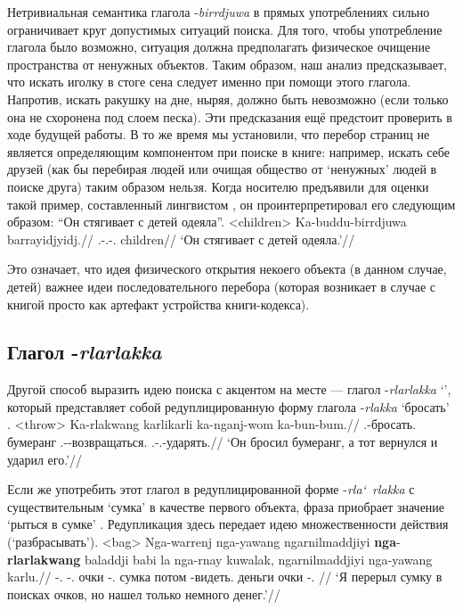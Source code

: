 Нетривиальная семантика глагола -\textit{birrdjuwa} в прямых употреблениях сильно ограничивает круг допустимых ситуаций поиска. Для того, чтобы употребление глагола было возможно, ситуация должна предполагать физическое очищение пространства от ненужных объектов. %
Таким образом, наш анализ предсказывает, что искать иголку в стоге сена следует именно при помощи этого глагола. Напротив, искать ракушку на дне, ныряя, должно быть невозможно (если только она не схоронена под слоем песка). Эти предсказания ещё предстоит проверить в ходе будущей работы. В то же время мы установили, что перебор страниц не является определяющим компонентом при поиске в книге: например, искать себе друзей (как бы перебирая людей или очищая общество от `ненужных' людей в поиске друга) таким образом нельзя. Когда носителю предъявили для оценки такой пример, составленный лингвистом , %
он проинтерпретировал его следующим образом: ``Он стягивает с детей одеяла''.
\ex<children>\begingl
\gla Ka-buddu-birrdjuwa barrayidjyidj.//
\glb \Tsg.\Real-\Tpl.\Obj-\bdj.\Np{} children//
\glft `Он стягивает с детей одеяла.'//%
\endgl\xe

Это означает, что идея физического открытия некоего объекта (в данном случае, детей) важнее идеи последовательного перебора (которая возникает в случае с книгой просто как артефакт устройства книги-кодекса).
\subsection{Глагол -\textit{rlarlakka}}
\label{sec:rlakka}
Другой способ выразить идею поиска с акцентом на месте --- глагол -\textit{rlarlakka} `\rlk', который представляет собой редуплицированную форму глагола -\textit{rlakka} `бросать' .
\ex<throw>\begingl
\gla Ka-rlakwang karlikarli ka-nganj-wom ka-bun-bum.//
\glb \Tsg.\Real-бросать.\Pst{} бумеранг \Tsg.\Real-\Hith-возвращаться.\Pst{} \Tsg.\Real-\Tsg.\Obj-ударять.\Pst{}//
\glft `Он бросил бумеранг, а тот вернулся и ударил его.'//%
\endgl\xe

Если же употребить этот глагол в редуплицированной форме -\textit{rla\char`~rlakka} с существительным `сумка' в качестве первого объекта, фраза приобрает значение `рыться в сумке' . Редупликация здесь передает идею множественности действия (`разбрасывать').
\ex<bag>\begingl
\gla Nga-warrenj nga-yawang ngarnilmaddjiyi \textbf{nga}-\textbf{rlarlakwang} baladdji babi la nga-rnay kuwalak, ngarnilmaddjiyi nga-yawang karlu.//
\glb \nga-\warre.\Pst{} \nga-\yaw.\Pst{} очки \nga-\rlk.\Pst{} сумка потом \la{} \nga-видеть.\Pst{} деньги очки \nga-\yaw.\Pst{} \karlu{}//
\glft `Я перерыл сумку в поисках очков, но нашел только немного денег.'//%
\endgl\xe

